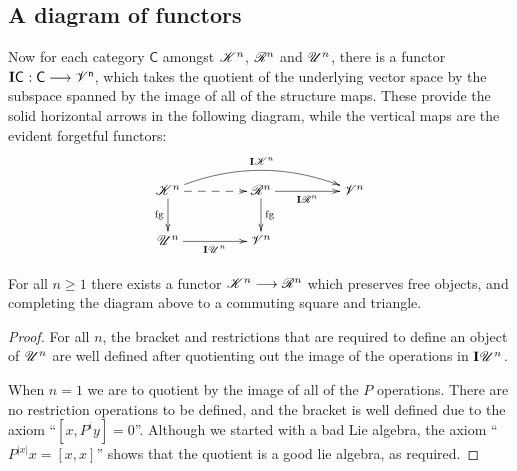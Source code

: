 \documentclass[11pt]{article}
\newcommand{\GS}[1]{\scrE^{#1}}
\newcommand{\PRLie}[1]{\scrR^{#1}}%
\newcommand{\LL}[1]{{\scrK}^{#1}}%
\newcommand{\GR}[1]{\scrV^{#1}}%
\newcommand{\nontop}[1]{\scrU^{#1}}%
\newcommand{\Ind}[2][]{\mathbf{I}{#2}_{#1}}%
\newcommand{\forget}{\mathrm{fg}}
\begin{document}
\begin{DiagramOfFunctors}
\section*{A diagram of functors}
Now for each category $\mathsf{C}$ amongst $\LL{n}$, $\PRLie{n}$ and $\nontop{n}$, there is a functor $\Ind{\mathsf{C}}:\mathsf{C\overset{}{\to}\GR{n}}$, which takes the quotient of the underlying vector space by the subspace spanned by the image of all of the structure maps. These provide the solid horizontal arrows in the following diagram, while the vertical maps are the evident forgetful functors: %
\[\xymatrix@R=8mm@C=15mm@!C{
\LL{n}
\ar@/^1.5em/[rr]^-{\Ind{\LL{n}}}
\ar[d]_-{\forget}
\ar@{-->}[r]_-{}%
&%
\PRLie{n}
\ar[d]^-{\forget}
\ar[r]_-{\Ind{\PRLie{n}}}
&%
\GR{n}
\\%
\nontop{n}
\ar[r]_-{\Ind{\nontop{n}}}
&%
\GR{n}
&%
}\]
\begin{prop*}
For all $n\geq1$ there exists a functor $\LL{n}\to\PRLie{n}$ which preserves free objects, and completing the diagram above to a commuting square and triangle.
\end{prop*}
\begin{proof}
For all $n$, the bracket and restrictions that are required to define an object of $\nontop{n}$ are well defined after quotienting out the image of the operations in $\Ind{\nontop{n}}$.

When $n=1$ we are to quotient by the image of all of the $P$ operations. There are no restriction operations to be defined, and the bracket is well defined due to the axiom ``$[x,P^iy]=0$''. Although we started with a bad Lie algebra, the axiom ``$P^{|x|}x=[x,x]$'' shows that the quotient is a good lie algebra, as required.


\end{proof}
\end{DiagramOfFunctors}
\end{document}
